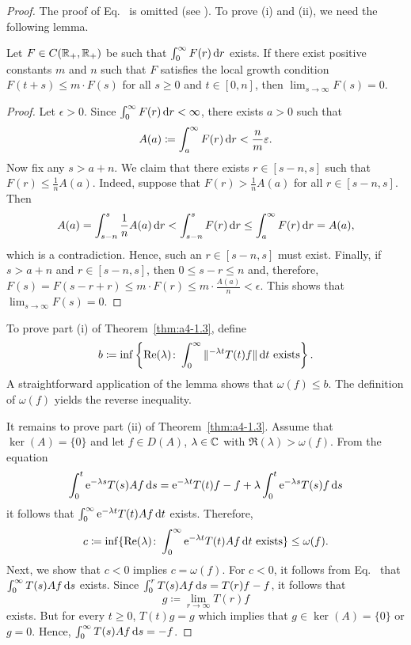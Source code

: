 \begin{proof}  The proof of Eq.~ is omitted (see \textcite[p.306]{hillephillips:1957}). 
To prove (i) and (ii), we need the following lemma.
\begin{lemma*}\label{lem:a4-1.3}
Let $F \in C(\mathbb{R}_{+},\mathbb{R}_{+})$ be such that $\int_{0}^{\infty} F(r) \mathop{}\!\mathrm{d}{r}$ exists. 
If there exist positive constants $m$ and $n$ such that $F$ satisfies the local growth condition $F(t + s) \leq m \cdot F(s)$ for all $s \geq 0$ and $t \in \left[0,n\right]$, then $\lim_{s \to \infty} F(s) = 0$.
\end{lemma*}
\begin{proof}
Let $\epsilon > 0$. Since $\int_0^\infty F(r) \mathop{}\!\mathrm{d}{r} < \infty$, there exists $a > 0$ such that
\[
A(a) \coloneq \int_{a}^{\infty} F(r) \dr < \frac{n}{m}\epsilon.
\]
Now fix any $s > a + n$. We claim that there exists $r \in [s - n, s]$ such that
\(
F(r) \leq \frac{1}{n}A(a).
\)
Indeed, suppose that $F(r) > \frac{1}{n}A(a)$ for all $r \in [s - n, s]$. Then
\[ 
A(a) = \int_{s-n}^{s}\frac{1}{n}A(a)\dr < \int_{s-n}^{s}F(r)\dr  \leq \int_a^\infty F(r)\dr = A(a) , 
\]
which is a contradiction.
Hence, such an $r \in [s - n, s]$ must exist.
Finally, if\/ $s>a+n$ and $r\in [s-n,s]$, then $0 \leq s-r \leq n$ and, therefore, $F(s) = F(s-r+r) \leq m \cdot F(r) \leq m \cdot \frac{A(a)}{n} < \epsilon$. 
This shows that $\lim_{s \to \infty} F(s) = 0$.
\end{proof}
To prove part (i) of Theorem~\ref{thm:a4-1.3}, define 
%
\[
	b \coloneq \inf \left\{\mathop{}\!\mathrm{Re}(\lambda)\colon\int_{0}^{\infty} \|^{-\lambda t} T(t)f\|  \mathop{}\!\mathrm{d}{t} \text{ exists} \right\}.
\]
%
A straightforward application of the lemma shows that $\omega(f) \leq b$.
The definition of\/ $\omega(f)$ yields the reverse inequality.

It remains to prove part (ii) of Theorem~\ref{thm:a4-1.3}.
Assume that $\ker(A) = \{0\}$ and let $f \in D(A)$, $\lambda \in \mathbb{C}$ with $\Re(\lambda) > \omega(f)$. 
From the equation
\[
\int_{0}^{t} \mathrm{e}^{-\lambda s} T(s)Af  \mathop{}\!\mathrm{d}{s} = \mathrm{e}^{-\lambda t}T(t)f - f + \lambda \int_{0}^{t} \mathrm{e}^{-\lambda s} T(s)f  \mathop{}\!\mathrm{d}{s}
\]
it follows that $\int_{0}^{\infty} \mathrm{e}^{-\lambda t} T(t)Af  \mathop{}\!\mathrm{d}{t}$ exists. 
Therefore, 
\[ 
c \coloneq \inf\{\Re(\lambda)\colon\int_{0}^{\infty} \eu^{-\lambda t}T(t)Af  \dt \text{ exists}\} \leq \omega(f) .
\]
Next, we show that $c < 0$ implies $c = \omega(f)$. 
For $c < 0$, it follows from Eq.~ that $\int_{0}^{\infty} T(s)Af  \mathop{}\!\mathrm{d}{s}$ exists. 
Since $\int_{0}^{r} T(s)Af  \mathop{}\!\mathrm{d}{s} = T(r)f - f$, it follows that \[g \coloneqq\lim_{r \to \infty} T(r)f\] exists. 
But for every $t \geq 0$, $T(t)g = g$ which implies that $g \in \ker(A) = \{0\}$ or $g = 0$. 
Hence, $\int_{0}^{\infty} T(s)Af  \mathop{}\!\mathrm{d}{s} = -f$.


\end{proof}
